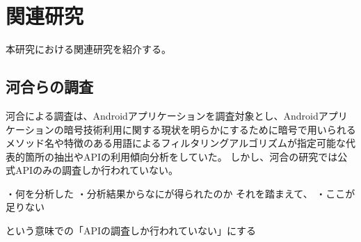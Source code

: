 \newpage
\section{関連研究} %
本研究における関連研究を紹介する。
\subsection{河合らの調査}
河合による調査は、Androidアプリケーションを調査対象とし、Androidアプリケーションの暗号技術利用に関する現状を明らかにするために暗号で用いられるメソッド名や特徴のある用語によるフィルタリングアルゴリズムが指定可能な代表的箇所の抽出やAPIの利用傾向分析をしていた。
しかし、河合の研究では公式APIのみの調査しか行われていない。


・何を分析した
・分析結果からなにが得られたのか
それを踏まえて、
・ここが足りない

という意味での「APIの調査しか行われていない」にする